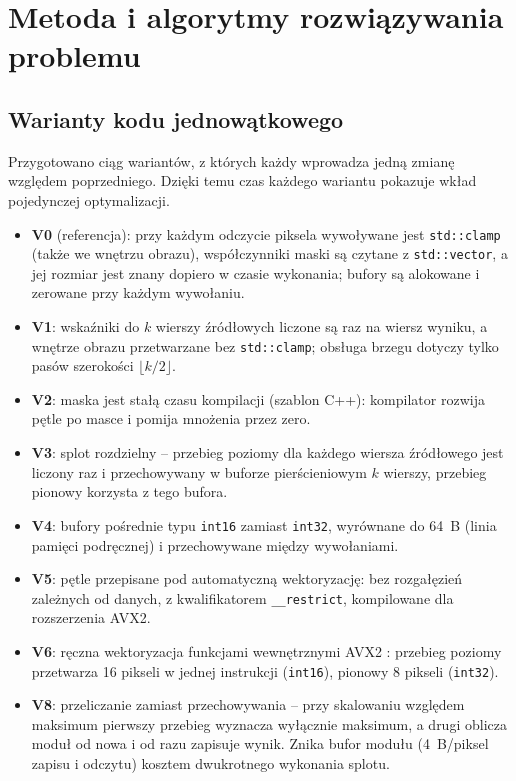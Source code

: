 \documentclass[12pt,a4paper]{article}
\newcommand{\kod}[1]{\texttt{#1}}
\begin{document}
\section{Metoda i algorytmy rozwiązywania problemu}

\subsection{Warianty kodu jednowątkowego}

Przygotowano ciąg wariantów, z których każdy wprowadza jedną zmianę względem poprzedniego. Dzięki temu czas każdego wariantu pokazuje wkład pojedynczej optymalizacji.
\begin{itemize}
	\item \textbf{V0} (referencja): przy każdym odczycie piksela wywoływane jest \kod{std::clamp} (także we wnętrzu obrazu), współczynniki maski są czytane z \kod{std::vector}, a jej rozmiar jest znany dopiero w czasie wykonania; bufory są alokowane i zerowane przy każdym wywołaniu.
	\item \textbf{V1}: wskaźniki do $k$ wierszy źródłowych liczone są raz na wiersz wyniku, a wnętrze obrazu przetwarzane bez \kod{std::clamp}; obsługa brzegu dotyczy tylko pasów szerokości $\lfloor k/2 \rfloor$.
	\item \textbf{V2}: maska jest stałą czasu kompilacji (szablon C++): kompilator rozwija pętle po masce i pomija mnożenia przez zero.
	\item \textbf{V3}: splot rozdzielny -- przebieg poziomy dla każdego wiersza źródłowego jest liczony raz i przechowywany w buforze pierścieniowym $k$ wierszy, przebieg pionowy korzysta z tego bufora.
	\item \textbf{V4}: bufory pośrednie typu \kod{int16} zamiast \kod{int32}, wyrównane do 64~B (linia pamięci podręcznej) i przechowywane między wywołaniami.
	\item \textbf{V5}: pętle przepisane pod automatyczną wektoryzację: bez rozgałęzień zależnych od danych, z kwalifikatorem \kod{\_\_restrict}, kompilowane dla rozszerzenia AVX2.
	\item \textbf{V6}: ręczna wektoryzacja funkcjami wewnętrznymi AVX2 \cite{intel}: przebieg poziomy przetwarza 16 pikseli w jednej instrukcji (\kod{int16}), pionowy 8 pikseli (\kod{int32}).
	\item \textbf{V8}: przeliczanie zamiast przechowywania -- przy skalowaniu względem maksimum pierwszy przebieg wyznacza wyłącznie maksimum, a drugi oblicza moduł od nowa i od razu zapisuje wynik. Znika bufor modułu (4~B/piksel zapisu i odczytu) kosztem dwukrotnego wykonania splotu.
\end{itemize}
\end{document}

